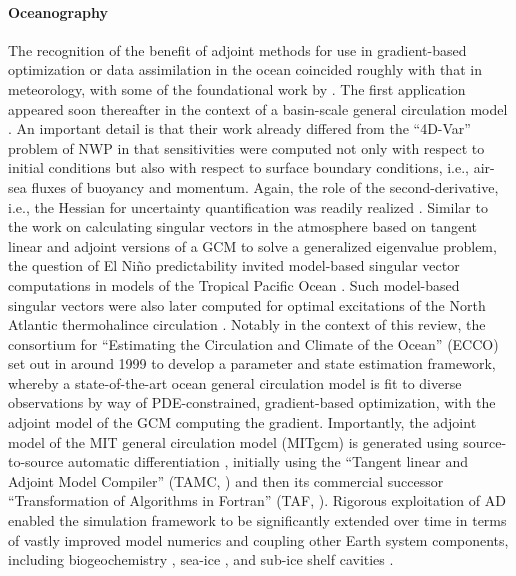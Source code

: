 \paragraph{Oceanography}
The recognition of the benefit of adjoint methods for use in gradient-based optimization or data assimilation in the ocean coincided roughly with that in meteorology, with some of the foundational work by \cite{Thacker:1988kp,Thacker:1988ed}. 
The first application appeared soon thereafter in the context of a basin-scale general circulation model \cite{Tziperman.1989,Tziperman:1992hg,Tziperman:1992jw}. 
An important detail is that their work already differed from the ``4D-Var'' problem of NWP in that sensitivities were computed not only with respect to initial conditions but also with respect to surface boundary conditions, i.e., air-sea fluxes of buoyancy and momentum.
Again, the role of the second-derivative, i.e., the Hessian for uncertainty quantification was readily realized \cite{Thacker:1989jf}.
Similar to the work on calculating singular vectors in the atmosphere based on tangent linear and adjoint versions of a GCM to solve a generalized eigenvalue problem, the question of El Ni\~no predictability invited model-based singular vector computations in models of the Tropical Pacific Ocean \cite{Moore:1997ci,Moore:1997fp}. Such model-based singular vectors were also later computed for optimal excitations of the North Atlantic thermohalince circulation \cite{Zanna.2010,Zanna:2011ge,Zanna:2012dw}.
Notably in the context of this review, the consortium for ``Estimating the Circulation and Climate of the Ocean'' (ECCO) \cite{Stammer.2002} set out in around 1999 to develop a parameter and state estimation framework, whereby a state-of-the-art ocean general circulation model is fit to diverse observations by way of PDE-constrained, gradient-based optimization, with the adjoint model of the GCM computing the gradient. Importantly, the adjoint model of the MIT general circulation model (MITgcm) is generated using source-to-source automatic differentiation \cite{Marotzke:1999wc,Heimbach.2005}, initially using the ``Tangent linear and Adjoint Model Compiler'' (TAMC, \cite{Giering:1998in}) and then its commercial successor ``Transformation of Algorithms in Fortran'' (TAF, \cite{Giering.2006}).
Rigorous exploitation of AD enabled the simulation framework to be significantly extended over time in terms of vastly improved model numerics \cite{Forget.2015m9i} and coupling other Earth system components, including biogeochemistry \cite{Dutkiewicz:2006gw}, sea-ice \cite{Heimbach:2010fz}, and sub-ice shelf cavities \cite{Heimbach:2012iu}.
